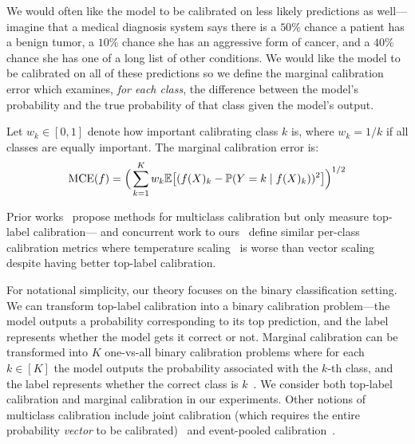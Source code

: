 We would often like the model to be calibrated on less likely predictions as well---imagine that a medical diagnosis system says there is a $50\%$ chance a patient has a benign tumor, a $10\%$ chance she has an aggressive form of cancer, and a $40\%$ chance she has one of a long list of other conditions. We would like the model to be calibrated on all of these predictions so we define the marginal calibration error which examines, \emph{for each class}, the difference between the model's probability and the true probability of that class given the model's output.

\begin{definition}
\label{dfn:marginal-ce}
  Let $w_k \in [0, 1]$ denote how important calibrating class $k$ is, where $w_k = 1/k$ if all classes are equally important. The marginal calibration error is:
\begin{align}
\textup{MCE}(f) = \Big( \sum_{k = 1}^K w_k \mathbb{E}\big[ (f(X)_k - \mathbb{P}(Y = k \mid f(X)_k))^2 \big] \Big)^{1/2}
\end{align}
\end{definition}

Prior works~\cite{guo2017calibration, hendrycks2019anomaly, hendrycks2019pretraining} propose methods for multiclass calibration but only measure top-label calibration---\cite{nixon2019calibration} and concurrent work to ours~\cite{kull2019temperature} define similar per-class calibration metrics where temperature scaling~\cite{guo2017calibration} is worse than vector scaling despite having better top-label calibration.


For notational simplicity, our theory focuses on the binary classification setting. We can transform top-label calibration into a binary calibration problem---the model outputs a probability corresponding to its top prediction, and the label represents whether the model gets it correct or not. Marginal calibration can be transformed into $K$ one-vs-all binary calibration problems where for each $k \in [K]$ the model outputs the probability associated with the $k$-th class, and the label represents whether the correct class is $k$~\cite{zadrozny2002transforming}. We consider both top-label calibration and marginal calibration in our experiments.
Other notions of multiclass calibration include joint calibration (which requires the entire probability \emph{vector} to be calibrated)~\cite{murphy1973vector, brocker2009decomposition} and event-pooled calibration~\cite{kuleshov2015calibrated}.

